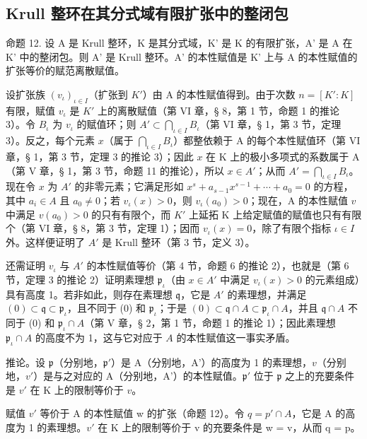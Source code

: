 \subsection{Krull 整环在其分式域有限扩张中的整闭包}

命题 12. 设 A 是 Krull 整环，K 是其分式域，K' 是 K 的有限扩张，A' 是 A 在 K' 中的整闭包。则 A' 是 Krull 整环。A' 的本性赋值是 K' 上与 A 的本性赋值的扩张等价的赋范离散赋值。

设扩张族 \((v_{\iota})_{\iota\in I}\)（扩张到 \(K'\)）由 A 的本性赋值得到。由于次数 \(n = [K':K]\) 有限，赋值 \(v_{\iota}\) 是 \(K'\) 上的离散赋值（第 VI 章，§ 8，第 1 节，命题 1 的推论 3）。令 \(B_{\iota}\) 为 \(v_{\iota}\) 的赋值环；则 \(A' \subset \bigcap_{\iota\in I}B_{\iota}\)（第 VI 章，§ 1，第 3 节，定理 3）。反之，每个元素 \(x\)（属于 \(\bigcap_{\iota\in I}B_{\iota}\)）都整依赖于 A 的每个本性赋值环（第 VI 章，§ 1，第 3 节，定理 3 的推论 3）；因此 \(x\) 在 K 上的极小多项式的系数属于 A（第 V 章，§ 1，第 3 节，命题 11 的推论），所以 \(x\in A'\)；从而 \(A' = \bigcap_{\iota\in I}B_{\iota}\)。现在令 \(x\) 为 \(A'\) 的非零元素；它满足形如 \(x^{s} + a_{s-1}x^{s-1} + \cdots + a_{0} = 0\) 的方程，其中 \(a_{i}\in A\) 且 \(a_{0}\neq 0\)；若 \(v_{\iota}(x) > 0\)，则 \(v_{\iota}(a_{0}) > 0\)；现在，A 的本性赋值 \(v\) 中满足 \(v(a_{0}) > 0\) 的只有有限个，而 \(K'\) 上延拓 K 上给定赋值的赋值也只有有限个（第 VI 章，§ 8，第 3 节，定理 1）；因而 \(v_{\iota}(x) = 0\)，除了有限个指标 \(\iota\in I\) 外。这样便证明了 \(A'\) 是 Krull 整环（第 3 节，定义 3）。

还需证明 \(v_{\iota}\) 与 \(A'\) 的本性赋值等价（第 4 节，命题 6 的推论 2），也就是（第 6 节，定理 3 的推论 2）证明素理想 \(\mathfrak{p}_{\iota}\)（由 \(x \in A'\) 中满足 \(v_{\iota}(x) > 0\) 的元素组成）具有高度 1。若非如此，则存在素理想 \(\mathfrak{q}\)，它是 \(A'\) 的素理想，并满足 \((0) \subset \mathfrak{q} \subset \mathfrak{p}_{\iota}\)，且不同于 (0) 和 \(\mathfrak{p}_{\iota}\)；于是 \((0) \subset \mathfrak{q} \cap A \subset \mathfrak{p}_{\iota} \cap A\)，并且 \(\mathfrak{q} \cap A\) 不同于 (0) 和 \(\mathfrak{p}_{\iota} \cap A\)（第 V 章，§ 2，第 1 节，命题 1 的推论 1）；因此素理想 \(\mathfrak{p}_{\iota} \cap A\) 的高度不为 1，这与它对应于 \(A\) 的本性赋值这一事实矛盾。

推论。设 \(\mathfrak{p}\)（分别地，\(\mathfrak{p}'\)）是 A（分别地，A'）的高度为 1 的素理想，\(v\)（分别地，\(v'\)）是与之对应的 A（分别地，A'）的本性赋值。\(\mathfrak{p}'\) 位于 \(\mathfrak{p}\) 之上的充要条件是 \(v'\) 在 K 上的限制等价于 \(v\)。

赋值 \(v'\) 等价于 A 的本性赋值 w 的扩张（命题 12）。令 \(q = p' \cap A\)，它是 A 的高度为 1 的素理想。\(v'\) 在 K 上的限制等价于 v 的充要条件是 w = v，从而 q = p。


